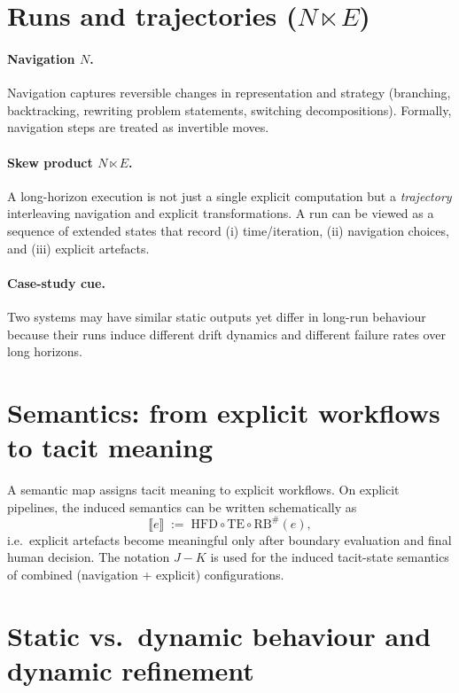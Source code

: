\section{Runs and trajectories ($N \ltimes E$)}
\label{sec:lookup-runs}

\paragraph{Navigation $N$.}
Navigation captures reversible changes in representation and strategy (branching, backtracking,
rewriting problem statements, switching decompositions). Formally, navigation steps are treated as
invertible moves.

\paragraph{Skew product $N \ltimes E$.}
A long-horizon execution is not just a single explicit computation but a \emph{trajectory} interleaving
navigation and explicit transformations. A run can be viewed as a sequence of extended states that
record (i) time/iteration, (ii) navigation choices, and (iii) explicit artefacts.

\paragraph{Case-study cue.}
Two systems may have similar static outputs yet differ in long-run behaviour because their runs
induce different drift dynamics and different failure rates over long horizons.

\section{Semantics: from explicit workflows to tacit meaning}
\label{sec:lookup-semantics}

A semantic map assigns tacit meaning to explicit workflows. On explicit pipelines,
the induced semantics can be written schematically as
\[
\llbracket e \rrbracket \;:=\; \mathrm{HFD} \circ \mathrm{TE} \circ \mathrm{RB}^{\#}(e),
\]
i.e.\ explicit artefacts become meaningful only after boundary evaluation and final human decision.
The notation $J{-}K$ is used for the induced tacit-state semantics of combined (navigation + explicit)
configurations.

\section{Static vs.\ dynamic behaviour and dynamic refinement}
\label{sec:lookup-dynamics}

